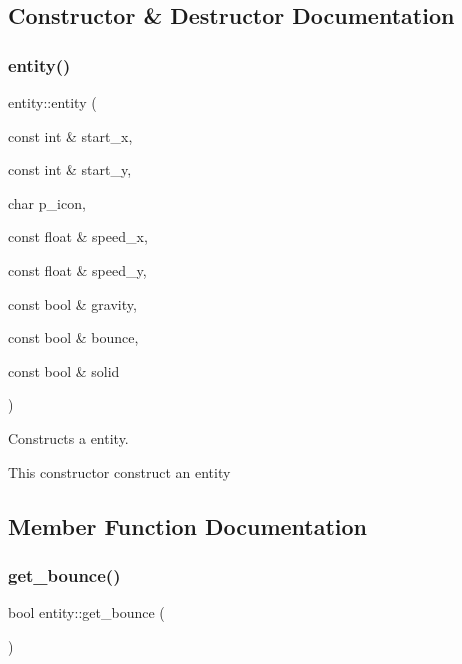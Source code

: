 \subsection{Constructor \& Destructor Documentation}
\mbox{\label{classentity_aee3c44b079e4b0909636151b8394fd5b}} 
\subsubsection{\texorpdfstring{entity()}{entity()}}
{\footnotesize\ttfamily entity\+::entity (\begin{DoxyParamCaption}\item[{const int \&}]{start\+\_\+x,  }\item[{const int \&}]{start\+\_\+y,  }\item[{char}]{p\+\_\+icon,  }\item[{const float \&}]{speed\+\_\+x,  }\item[{const float \&}]{speed\+\_\+y,  }\item[{const bool \&}]{gravity,  }\item[{const bool \&}]{bounce,  }\item[{const bool \&}]{solid }\end{DoxyParamCaption})\hspace{0.3cm}{\ttfamily [inline]}}



Constructs a entity. 

This constructor construct an entity 

\subsection{Member Function Documentation}
\mbox{\label{classentity_a0c3bddcd6f6512eb0826dfebc90e5b05}} 
\subsubsection{\texorpdfstring{get\+\_\+bounce()}{get\_bounce()}}
{\footnotesize\ttfamily bool entity\+::get\+\_\+bounce (\begin{DoxyParamCaption}{ }\end{DoxyParamCaption})\hspace{0.3cm}{\ttfamily [inline]}}



